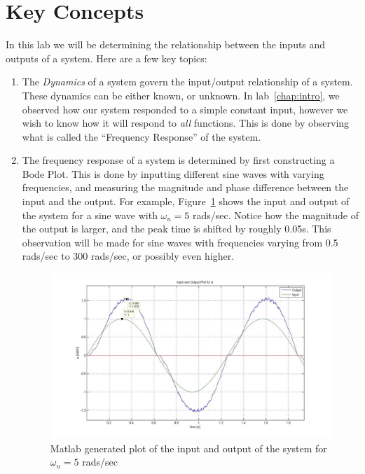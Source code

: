 \section{Key Concepts}
In this lab we will be determining the relationship between the inputs and outputs
of a system. Here are a few key topics:
\begin{enumerate}
    \item The \emph{Dynamics} of a system govern the input/output relationship
          of a system. These dynamics can be either known, or unknown. In lab~\ref{chap:intro},
          we observed how our system responded to a simple constant input, however we wish to know
          how it will respond to \emph{all} functions. This is done by observing what is called the
          ``Frequency Response'' of the system.
    \item The  frequency response of a system is determined by first constructing a Bode Plot.
          This is done by inputting different sine waves with varying frequencies, and measuring
          the magnitude and phase difference between the input and the output. For example,
          Figure~\ref{fig:FreqResp} shows the input and output of the system for a sine wave with
          \(\omega_u = 5\) rads/sec. Notice how the  magnitude of the output is larger, and the peak time
          is shifted by roughly 0.05s. This observation will be made for sine waves with frequencies varying
          from 0.5 rads/sec to 300 rads/sec, or possibly even higher.
          \begin{figure}[htbp]
              \centering
              \includegraphics[width=\hsize,height = 0.6\hsize]{pix/FreqResp.jpg}
              \caption{\textsf{Matlab} generated plot of the input and output  of the system for \(\omega_u = 5\) rads/sec}\label{fig:FreqResp}
          \end{figure}


\end{enumerate}
